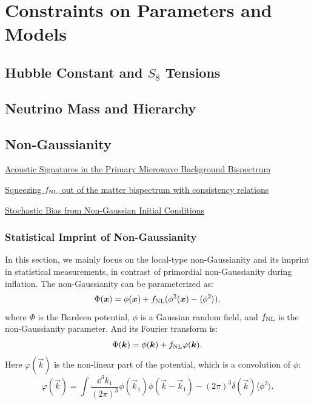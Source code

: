 \chapter{Constraints on Parameters and Models}

\section{Hubble Constant and $S_8$ Tensions}

\section{Neutrino Mass and Hierarchy}

\section{Non-Gaussianity}
\begin{introduction}
    \item \href{https://arxiv.org/pdf/astro-ph/0005036}{Acoustic Signatures in the Primary Microwave Background Bispectrum}
    \item \href{https://arxiv.org/pdf/2209.06228}{Squeezing $f_{\rm NL}$ out of the matter bispectrum with consistency relations}
    \item \href{https://arxiv.org/pdf/1209.2173}{Stochastic Bias from Non-Gaussian Initial Conditions}
\end{introduction}
\subsection{Statistical Imprint of Non-Gaussianity}

In this section, we mainly focus on the local-type non-Gaussianity and its imprint in statistical measurements, in contrast of primordial non-Gaussianity during inflation. The non-Gaussianity can be parameterized as:
\begin{equation}
    \Phi(\vec{x}) = \phi(\vec{x}) + f_{\rm NL}(\phi^2(\vec{x})-\langle \phi^2 \rangle),
    \label{ng-gaussian}
\end{equation}
where $\Phi$ is the Bardeen potential, $\phi$ is a Gaussian random field, and $f_{\rm NL}$ is the non-Gaussianity parameter. And its Fourier transform is:
\begin{equation}
    \Phi(\vec{k}) = \phi(\vec{k}) + f_{\rm NL}\varphi(\vec{k}).
\end{equation}
Here $\varphi(\vec{k})$ is the non-linear part of the potential, which is a convolution of $\phi$:
\begin{equation}
    \varphi(\vec{k}) = \int \dfrac{\dd^3 k_1}{(2\pi)^3} \phi(\vec{k}_1)\phi(\vec{k}-\vec{k}_1) - (2\pi)^3\delta(\vec{k})\langle \phi^2\rangle.
\end{equation}

